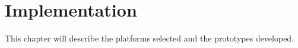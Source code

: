 \chapter{Implementation}
This chapter will describe the platforms selected and the prototypes developed.